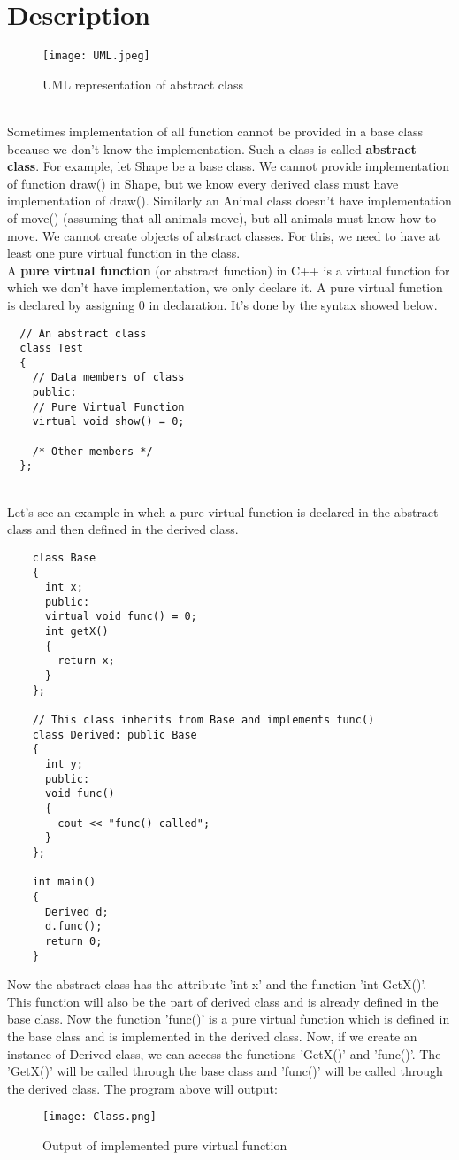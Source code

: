 \documentclass[11pt,fleqn]{book} %
\begin{document}
\section{Description}
\begin{figure}[h]
  \centering
  \texttt{[image: UML.jpeg]}
  \caption{UML representation of abstract class}
\end{figure} ~\\
Sometimes implementation of all function cannot be provided in a base class because we don’t know the implementation. Such a class is called \textbf{abstract class}. For example, let Shape be a base class. We cannot provide implementation of function draw() in Shape, but we know every derived class must have implementation of draw(). Similarly an Animal class doesn’t have implementation of move() (assuming that all animals move), but all animals must know how to move. We cannot create objects of abstract classes. For this, we need to have at least one pure virtual function in the class. \\
A \textbf{pure virtual function} (or abstract function) in C++ is a virtual function for which we don’t have implementation, we only declare it. A pure virtual function is declared by assigning 0 in declaration. It's done by the syntax showed below.
\begin{lstlisting}
  // An abstract class
  class Test
  {   
    // Data members of class
    public:
    // Pure Virtual Function
    virtual void show() = 0;

    /* Other members */
  };
\end{lstlisting} ~\\
Let's see an example in whch a pure virtual function is declared in the abstract class and then defined in the derived class.
\begin{example}
  \begin{lstlisting}
    class Base
    {
      int x;
      public:
      virtual void func() = 0;
      int getX() 
      {
        return x; 
      }
    };

    // This class inherits from Base and implements func()
    class Derived: public Base
    {
      int y;
      public:
      void func()
      {
        cout << "func() called";
      }
    };

    int main()
    {
      Derived d;
      d.func();
      return 0;
    }
  \end{lstlisting}
  Now the abstract class has the attribute 'int x' and the function 'int GetX()'. This function will also be the part of derived class and is already defined in the base class. Now the function 'func()' is a pure virtual function which is defined in the base class and is implemented in the derived class. Now, if we create an instance of Derived class, we can access the functions 'GetX()' and 'func()'. The 'GetX()' will be called through the base class and 'func()' will be called through the derived class.
  The program above will output:
  \begin{figure}[h]
    \centering
    \texttt{[image: Class.png]}
    \caption{Output of implemented pure virtual function}
  \end{figure}
\end{example}
\end{document}
